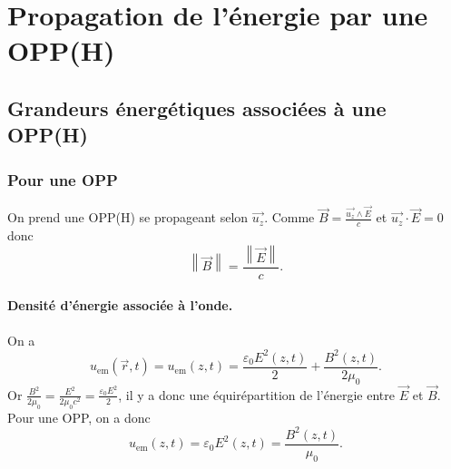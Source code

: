 \section{Propagation de l'énergie par une OPP(H)}
\subsection{Grandeurs énergétiques associées à une OPP(H)}

\subsubsection{Pour une OPP}
On prend une OPP(H) se propageant selon $\vec{u_z}$. Comme $\vec{B}=\frac{\vec{u_z}\wedge\vec{E}}{c}$ et $\vec{u_z}\cdot\vec{E}=0$ donc 
\begin{equation*}
    \boxed{
        \left\lVert\vec{B}\right\rVert=\frac{\left\lVert\vec{E}\right\rVert}{c}.
    }
\end{equation*}

\paragraph{Densité d'énergie associée à l'onde.}
On a 
\begin{equation*}
    u_{\mathrm{em}}(\vec{r},t)=u_{\mathrm{em}}(z,t)=\frac{\varepsilon_0E^{2}(z,t)}{2}+\frac{B^{2}(z,t)}{2\mu_0}.
\end{equation*}
Or $\frac{B^{2}}{2\mu_0}=\frac{E^{2}}{2\mu_0 c^{2}}=\frac{\varepsilon_0 E^{2}}{2}$, il y a donc une équirépartition de l'énergie entre $\vec{E}$ et $\vec{B}$. Pour une OPP, on a donc
\begin{equation*}
    \boxed{
        u_{\mathrm{em}}(z,t)=\varepsilon_0E^{2}(z,t)=\frac{B^{2}(z,t)}{\mu_0}.
    }
\end{equation*}

